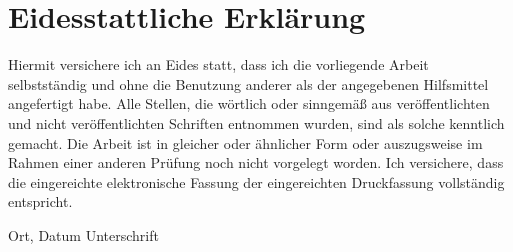 \documentclass[12pt,a4paper,oneside,hyphens, draft]{article}
\begin{document}


\newpage
\listoffigures
\newpage
\listoftables
\newpage
\listoflistings
\newpage

\newpage






\newpage




\newpage
{}
\section*{Eidesstattliche Erklärung}

\noindent Hiermit versichere ich an Eides statt, dass ich die vorliegende Arbeit selbst\-ständig und ohne die Benutzung
anderer als der angegebenen Hilfsmittel angefertigt habe. Alle Stellen, die wörtlich oder sinngemäß aus
veröffentlichten und nicht veröffentlichten Schriften entnommen wurden, sind als solche kenntlich gemacht. Die Arbeit ist
in gleicher oder ähnlicher Form oder auszugsweise im Rahmen einer anderen Prüfung noch nicht vorgelegt worden. Ich
versichere, dass die eingereichte elektronische Fassung der eingereichten Druckfassung vollständig entspricht.

\vspace{2cm}
\hspace{2cm} Ort, Datum \hfill Unterschrift \hspace{2cm}
\end{document}

